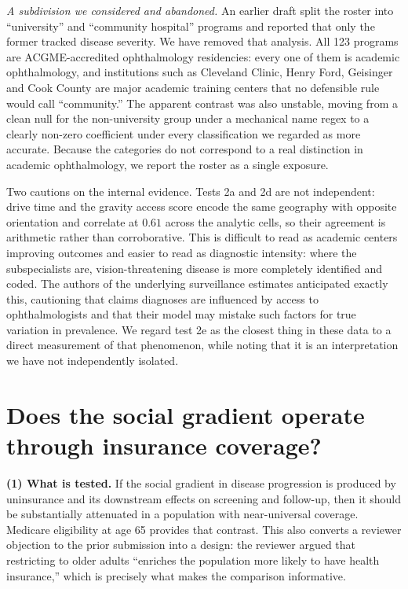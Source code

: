 \documentclass[11pt]{article}
\newcommand{\tpart}[1]{\medskip\noindent\textbf{#1}\quad}
\begin{document}
\medskip
\noindent\emph{A subdivision we considered and abandoned.} An earlier draft
split the roster into ``university'' and ``community hospital'' programs and
reported that only the former tracked disease severity. We have removed that
analysis. All 123 programs are ACGME-accredited ophthalmology residencies:
every one of them is academic ophthalmology, and institutions such as Cleveland
Clinic, Henry Ford, Geisinger and Cook County are major academic training
centers that no defensible rule would call ``community.'' The apparent contrast
was also unstable, moving from a clean null for the non-university group under
a mechanical name regex to a clearly non-zero coefficient under every
classification we regarded as more accurate. Because the categories do not
correspond to a real distinction in academic ophthalmology, we report the
roster as a single exposure.

\medskip
\noindent Two cautions on the internal evidence. Tests 2a and 2d are not independent:
drive time and the gravity access score encode the same geography with opposite
orientation and correlate at $0.61$ across the analytic cells, so their
agreement is arithmetic rather
than corroborative.  This is difficult to read as academic
centers improving outcomes and easier to read as diagnostic intensity: where the
subspecialists are, vision-threatening disease is more completely identified and
coded. The authors of the underlying surveillance estimates anticipated exactly
this, cautioning that claims diagnoses are influenced by access to
ophthalmologists and that their model may mistake such factors for true
variation in prevalence. We regard test 2e as the closest thing in these data to
a direct measurement of that phenomenon, while noting that it is an
interpretation we have not independently isolated.

\section{Does the social gradient operate through insurance coverage?}

\tpart{(1) What is tested.}
If the social gradient in disease progression is produced by uninsurance and its
downstream effects on screening and follow-up, then it should be substantially
attenuated in a population with near-universal coverage. Medicare eligibility at
age 65 provides that contrast. This also converts a reviewer objection to the
prior submission into a design: the reviewer argued that restricting to older
adults ``enriches the population more likely to have health insurance,'' which
is precisely what makes the comparison informative.
\end{document}

